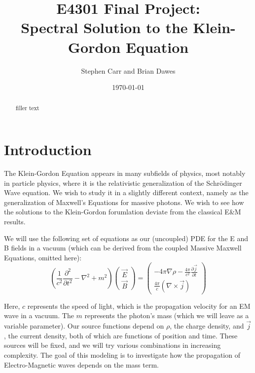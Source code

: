 \documentclass{article}
\begin{document}
	\title{E4301 Final Project:\\Spectral Solution to the Klein-Gordon Equation}
	\author{Stephen Carr and Brian Dawes}
	\date{\today}
	\maketitle
	
	\begin{abstract}
		filler text
	\end{abstract}
	
	\section{Introduction}
	
	
	The Klein-Gordon Equation appears in many subfields of physics, most notably in particle physics, where it is the relativistic generalization of the Schr\"odinger Wave equation. We wish to study it in a slightly different context, namely as the generalization of Maxwell's Equations for massive photons. We wish to see how the solutions to the Klein-Gordon forumlation deviate from the classical E\&M results.
	
	We will use the following set of equations as our (uncoupled) PDE for the E and B fields in a vacuum (which can be derived from the coupled Massive Maxwell Equations, omitted here):
	\begin{equation}
	\boxed{
		\left(\frac{1}{c^2}\frac{\partial^2}{\partial t^2} - \nabla^2 + m^2\right)
		\begin{pmatrix}
		\vec{E} \\
		\vec{B}
		\end{pmatrix}
		=
		\begin{pmatrix}
		-4\pi\nabla\rho - \frac{4\pi}{c^2}\frac{\partial\vec{j}}{\partial t} \\
		\frac{4\pi}{c}(\nabla\times\vec{j})
		\end{pmatrix}
	}
	\end{equation}
	
	Here, $c$ represents the speed of light, which is the propagation velocity for an EM wave in a vacuum. The $m$ represents the photon's mass (which we will leave as a variable parameter). Our source functions depend on $\rho$, the charge density, and $\vec{j}$, the current density, both of which are functions of position and time. These sources will be fixed, and we will try various combinations in increasing complexity. The goal of this modeling is to investigate how the propagation of Electro-Magnetic waves depends on the mass term.
	
\end{document}
